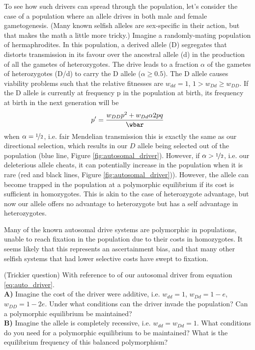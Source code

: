{To see how such drivers can spread through the population, let's
consider the case of a population where an allele drives in both male
and female gametogenesis. (Many known selfish alleles are sex-specific
in their action,
but that makes the math a little more tricky.)
Imagine a randomly-mating population of hermaphrodites. In this
population, a derived allele (D) segregates that distorts transmission
in its favour over the ancestral allele (d) in the production of all
the gametes of heterozygotes. The drive leads to a fraction $\alpha$ of the gametes
of heterozygotes (D/d) to carry the D allele ($\alpha \geq 0.5$). The D allele
causes viability problems such that the
relative fitnesses are $w_{dd}=1$, $1 > w_{Dd} \geq w_{DD}$. If the D allele
is currently at frequency p in the population at birth, its frequency
at birth in the next generation will be
\begin{equation}
p^{\prime}=\frac{w_{DD}p^2 + w_{Dd} \alpha 2pq  }{\wbar} \label{eq:auto_driver}
 \end{equation}
when $\alpha=\nicefrac{1}{2}$, i.e. fair Mendelian transmission this is exactly the same as our directional selection, which results in our $D$
allele being selected out of the population (blue line, Figure \ref{fig:autosomal_driver}). However, if
$\alpha>\nicefrac{1}{2}$, i.e. our deleterious allele cheats, it can potentially
increase in the population when it is rare (red and black lines,
Figure \ref{fig:autosomal_driver})). However, the allele can become
trapped in the population at a polymorphic equilibrium if its cost is
sufficient in homozygotes. This is akin to the case of heterozygote
advantage, but now our allele offers no advantage to heterozygote but
has a self advantage in heterozygotes.



Many of the known autosomal drive systems are polymorphic in
populations, unable to reach fixation in the population due to their
costs in homozygotes. It seems likely that this represents an
ascertainment bias, and that many other selfish systems that had
lower selective costs have swept to
fixation. 

\begin{question}{ (Trickier question)}
  With reference to of our autosomal driver from equation
  \ref{eq:auto_driver}.\\
  {\bf A)}	Imagine the cost of the driver were additive, i.e.  $w_{dd}=1$, $w_{Dd}=1-e$, $w_{DD}=1-2e$. Under what conditions can the
driver invade the population? Can a polymorphic equilibrium be maintained?\\
{\bf B)}	Imagine the allele is completely recessive, i.e. $w_{dd}=w_{Dd}=1$. What conditions do you need for a polymorphic equilibrium to be maintained? What is the equilibrium frequency of this balanced polymorphism?\\
\end{question}
}
